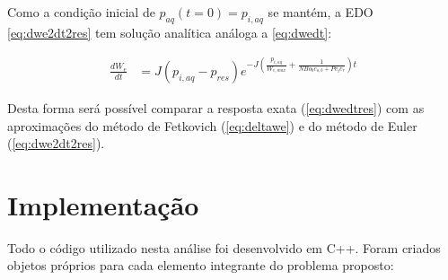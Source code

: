 \documentclass[final,5p]{elsarticle}
\numberwithin{equation}{section}
\begin{document}
        Como a condição inicial de $p_{aq}(t=0)=p_{i,aq}$ se mantém, a EDO \ref{eq:dwe2dt2res} tem solução analítica análoga a \ref{eq:dwedt}:

        \begin{align}
            \frac{dW_e}{dt} &= J (p_{i,aq} - p_{res}) e^{-J \left( \frac{p_{i,aq}}{W_{e,max}} + \frac{1}{N Bo_b c_{o,b} + Pv_i c_r} \right)  t} \label{eq:dwedtres}
        \end{align}

        Desta forma será possível comparar a resposta exata (\ref{eq:dwedtres}) com as aproximações do método de Fetkovich (\ref{eq:deltawe}) e do método de Euler (\ref{eq:dwe2dt2res}).


\section{Implementação} \label{sec:implementacao}

        Todo o código utilizado nesta análise foi desenvolvido em C++. Foram criados objetos próprios para cada elemento integrante do problema proposto:
\end{document}
